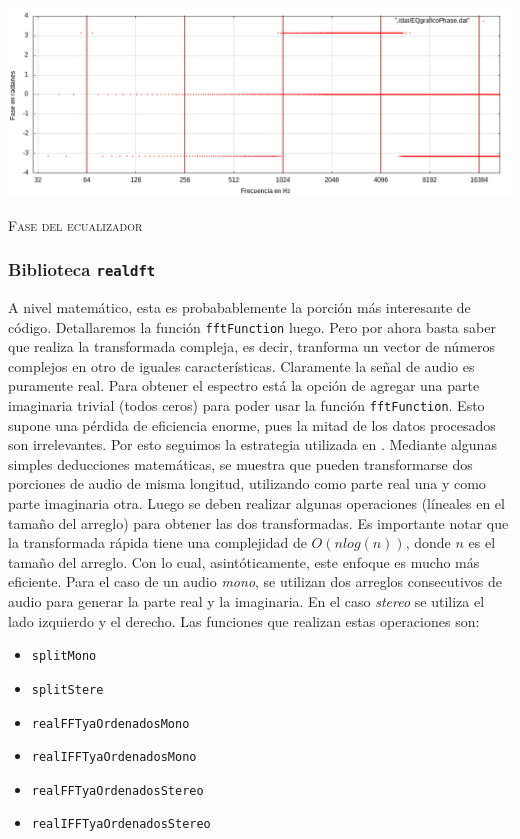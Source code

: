 \documentclass[%
    compressed,
    titlepage,
    narroweqnarray,
    inline,
    twoside,
    ]{ieee}
\begin{document}
\includegraphics[width=1\textwidth]{img/EQgraficoPhase.png}
\begin{center} \textsc{Fase del ecualizador} \end{center}


\subsubsection{Biblioteca \texttt{realdft}}
A nivel matem\'atico, esta es probabablemente la porci\'on m\'as interesante de c\'odigo.
Detallaremos la funci\'on \texttt{fftFunction} luego. Pero por ahora basta saber que realiza la transformada compleja, es decir, tranforma un vector de n\'umeros
complejos en otro de iguales caracter\'isticas.
Claramente la se\~nal de audio es puramente real. Para obtener el espectro est\'a la opci\'on de agregar una parte imaginaria trivial (todos ceros) para poder
usar la funci\'on \texttt{fftFunction}. Esto supone una p\'erdida de eficiencia enorme, pues la mitad de los datos procesados son irrelevantes. Por esto seguimos
la estrategia utilizada en \cite{realdft}. Mediante algunas simples deducciones matem\'aticas, se muestra que pueden transformarse dos porciones de audio de misma
longitud, utilizando como parte real una y como parte imaginaria otra. Luego se deben realizar algunas operaciones (l\'ineales en el tama\~no del arreglo) para
obtener las dos transformadas. Es importante notar que la transformada r\'apida tiene una complejidad de $O(n log(n) )$, donde $n$ es el tama\~no del arreglo.
Con lo cual, asint\'oticamente, este enfoque es mucho m\'as eficiente.
Para el caso de un audio \textit{mono}, se utilizan dos arreglos consecutivos de audio para generar la parte real y la imaginaria. En el caso \textit{stereo}
se utiliza el lado izquierdo y el derecho. Las funciones que realizan estas operaciones son:
\begin{itemize}
    \item \texttt{splitMono}
    \item \texttt{splitStere}
    \item \texttt{realFFTyaOrdenadosMono}
    \item \texttt{realIFFTyaOrdenadosMono}
    \item \texttt{realFFTyaOrdenadosStereo}
    \item \texttt{realIFFTyaOrdenadosStereo}
\end{itemize}
\end{document}
